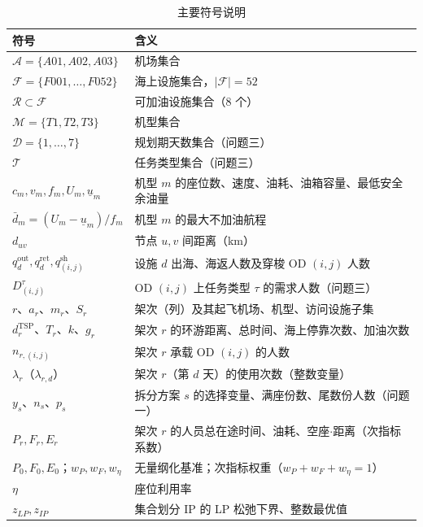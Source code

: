\documentclass[zihao=-4,a4paper]{ctexart}
\begin{document}
\begin{table}[H]
  \centering
  \caption{主要符号说明}
  \label{tab:notation}
  \small
  \begin{tabular}{ll}
    \toprule
    符号 & 含义 \\
    \midrule
    $\mathcal{A}=\{A01,A02,A03\}$ & 机场集合 \\
    $\mathcal{F}=\{F001,\dots,F052\}$ & 海上设施集合，$|\mathcal{F}|=52$ \\
    $\mathcal{R}\subset\mathcal{F}$ & 可加油设施集合（8 个） \\
    $\mathcal{M}=\{T1,T2,T3\}$ & 机型集合 \\
    $\mathcal{D}=\{1,\dots,7\}$ & 规划期天数集合（问题三） \\
    $\mathcal{T}$ & 任务类型集合（问题三） \\
    $c_m, v_m, f_m, U_m, \underline{u}_m$ & 机型 $m$ 的座位数、速度、油耗、油箱容量、最低安全余油量 \\
    $\bar d_m=(U_m-\underline{u}_m)/f_m$ & 机型 $m$ 的最大不加油航程 \\
    $d_{uv}$ & 节点 $u,v$ 间距离（km） \\
    $q_d^{\text{out}}, q_d^{\text{ret}}, q^{\text{sh}}_{(i,j)}$ & 设施 $d$ 出海、海返人数及穿梭 OD $(i,j)$ 人数 \\
    $D_{(i,j)}^{\tau}$ & OD $(i,j)$ 上任务类型 $\tau$ 的需求人数（问题三） \\
    $r$、$a_r$、$m_r$、$S_r$ & 架次（列）及其起飞机场、机型、访问设施子集 \\
    $d_r^{\text{TSP}}$、$T_r$、$k$、$g_r$ & 架次 $r$ 的环游距离、总时间、海上停靠次数、加油次数 \\
    $n_{r,(i,j)}$ & 架次 $r$ 承载 OD $(i,j)$ 的人数 \\
    $\lambda_r$（$\lambda_{r,d}$） & 架次 $r$（第 $d$ 天）的使用次数（整数变量） \\
    $y_s$、$n_s$、$p_s$ & 拆分方案 $s$ 的选择变量、满座份数、尾数份人数（问题一） \\
    $P_r, F_r, E_r$ & 架次 $r$ 的人员总在途时间、油耗、空座$\cdot$距离（次指标系数） \\
    $P_0,F_0,E_0$；$w_P,w_F,w_\eta$ & 无量纲化基准；次指标权重（$w_P+w_F+w_\eta=1$） \\
    $\eta$ & 座位利用率 \\
    $z_{LP}, z_{IP}$ & 集合划分 IP 的 LP 松弛下界、整数最优值 \\
    \bottomrule
  \end{tabular}
\end{table}
\end{document}

